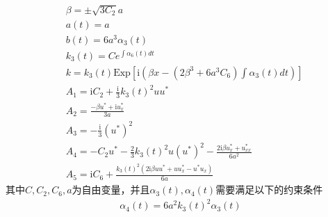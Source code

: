 \begin{align}
  & \beta = \pm \sqrt{3C_{2}}a \\
  & a(t) = a \\
  & b(t) = 6a^{3}\alpha_{3}(t) \\
  & k_{3}(t) = Ce^{\int \alpha_{6}(t)dt}   \\
  & k = k_{3}(t)\mathrm{Exp}\left[\mathrm{i}\left(\beta x - (2\beta^{3} + 6a^{3}C_{6})\int \alpha_{3}(t)dt \right)\right] \\
  & A_{1} = \mathrm{i}C_{2} + \frac{\mathrm{i}}{3}k_{3}(t)^{2}uu^{*} \\
  & A_{2} = \frac{-\beta u^{*} + \mathrm{i}u^{*}_{x}}{3a}   \\
  & A_{3} = -\frac{\mathrm{i}}{3}(u^{*})^{2}  \\
  & A_{4} = -C_{2}u^{*} - \frac{2}{3}k_{3}(t)^{2}u(u^{*})^{2} - \frac{2\mathrm{i}\beta u^{*}_{x} + u^{*}_{xx}}{6a^{2}} \\
  & A_{5} = \mathrm{i}C_{6} + \frac{k_{3}(t)^{2}(2\mathrm{i}\beta uu^{*} + uu^{*}_{x} - u^{*}u_{x})}{6a}
\end{align}
其中$C, C_{2}, C_{6}, a$为自由变量，并且$\alpha_{3}(t), \alpha_{4}(t)$需要满足以下的约束条件
\begin{align}
  \alpha_{4}(t) = 6a^{2}k_{3}(t)^{2}\alpha_{3}(t)
\end{align}


